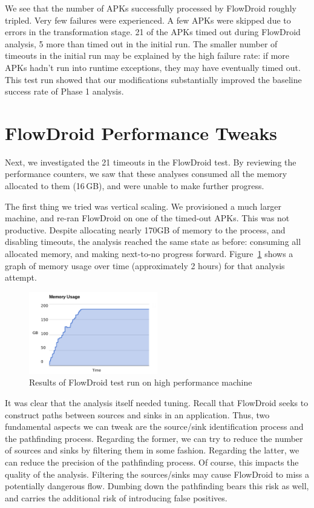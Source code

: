 We see that the number of APKs successfully processed by FlowDroid roughly tripled.   Very few failures were experienced.  A few APKs were skipped due to errors in the transformation stage.  21 of the APKs timed out during FlowDroid analysis, 5 more than timed out in the initial run.  The smaller number of timeouts in the initial run may be explained by the high failure rate: if more APKs hadn't run into runtime exceptions, they may have eventually timed out.  This test run showed that our modifications substantially improved the baseline success rate of Phase 1 analysis.

\section{FlowDroid Performance Tweaks}
Next, we investigated the 21 timeouts in the FlowDroid test.  By reviewing the performance counters, we saw that these analyses consumed all the memory allocated to them (16\,GB), and were unable to make further progress.

The first thing we tried was vertical scaling.  We provisioned a much larger machine, and re-ran FlowDroid on one of the timed-out APKs.  This was not productive.  Despite allocating nearly 170GB of memory to the process, and disabling timeouts, the analysis reached the same state as before: consuming all allocated memory, and making next-to-no progress forward.  Figure~\ref{fig:high_phase1} shows a graph of memory usage over time (approximately 2 hours) for that analysis attempt.

\begin{figure}[h]
	\centering
	\includegraphics[width=0.50\textwidth]{flowdroid_perf.pdf}
	\caption{Results of FlowDroid test run on high performance machine}
	\label{fig:high_phase1}
\end{figure}

It was clear that the analysis itself needed tuning.  Recall that FlowDroid seeks to construct paths between sources and sinks in an application.  Thus, two fundamental aspects we can tweak are the source/sink identification process and the pathfinding process.  Regarding the former, we can try to reduce the number of sources and sinks by filtering them in some fashion.  Regarding the latter, we can reduce the precision of the pathfinding process.  Of course, this impacts the quality of the analysis.  Filtering the sources/sinks may cause FlowDroid to miss a potentially dangerous flow.  Dumbing down the pathfinding bears this risk as well, and carries the additional risk of introducing false positives. 

